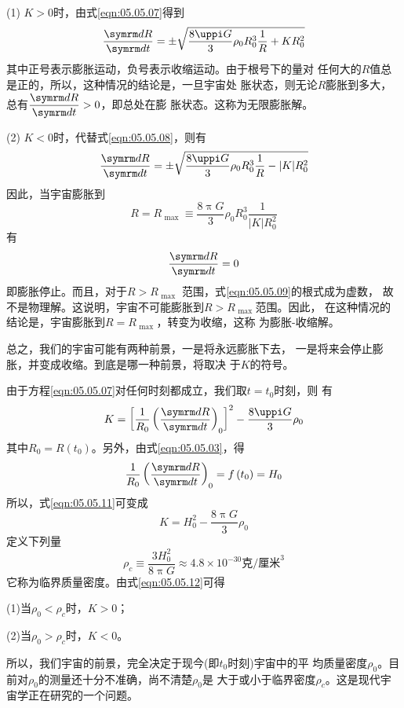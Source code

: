 (1) $ K > 0 $时，由式\eqref{eqn:05.05.07}得到
\begin{equation}\label{eqn:05.05.08}
  \frac { \dif R } { \dif t } = \pm \sqrt { \frac { 8 \uppi G } { 3 } \rho _ { 0 } R _ { 0 } ^ { 3 } \frac { 1 } { R } + K R _ 0 ^ { 2 } }
\end{equation}
其中正号表示膨胀运动，负号表示收缩运动。由于根号下的量对
任何大的$ R $值总是正的，所以，这种情况的结论是，一旦宇宙处
胀状态，则无论$ R $膨胀到多大，总有$ \dfrac { \dif R } { \dif t } > 0 $，即总处在膨
胀状态。这称为无限膨胀解。

(2) $ K < 0 $时，代替式\eqref{eqn:05.05.08}，则有
\begin{equation}\label{eqn:05.05.09}
  \frac { \dif R } { \dif t } = \pm \sqrt { \frac { 8 \uppi G } { 3 } \rho _ { 0 } R _ { 0 } ^ { 3 } \frac { 1 } { R } - | K | R _ 0 ^ { 2 } }
\end{equation}
因此，当宇宙膨胀到
\begin{equation}\label{eqn:05.05.10}
  R = R _ { \text { max } } \equiv \frac { 8 \uppi G } { 3 } \rho _ { 0 } R _ { 0 } ^ { 3 } \frac { 1 } { | K | R _ { 0 } ^ 2 }
\end{equation}
有
\begin{equation*}
  \frac { \dif R } { \dif t } = 0
\end{equation*}
即膨胀停止。而且，对于$ R > R _ { \text { max } } $ 范围，式\eqref{eqn:05.05.09}的根式成为虚数，
故不是物理解。这说明，宇宙不可能膨胀到$ R > R _ { \text { max } } $范围。因此，
在这种情况的结论是，宇宙膨胀到$ R = R _ { \text { max } } $，转变为收缩，这称
为膨胀-收缩解。

总之，我们的宇宙可能有两种前景，一是将永远膨胀下去，
一是将来会停止膨胀，并变成收缩。到底是哪一种前景，将取决
于$ K $的符号。

由于方程\eqref{eqn:05.05.07}对任何时刻都成立，我们取$ t=t_0 $时刻，则
有
\begin{equation}\label{eqn:05.05.11}
  K = \left[ \frac { 1 } { R _ { 0 } } \left( \frac { \dif R } { \dif t } \right) _ 0 \right] ^ { 2 } - \frac { 8 \uppi G } { 3 } \rho _ { 0 }
\end{equation}
其中$ R _ { 0 } = R \left( t _ { 0 } \right) $。另外，由式\eqref{eqn:05.05.03}，得
\begin{equation*}
  \frac { 1 } { R _ { 0 } } \left( \frac { \dif R } { \dif t } \right) _ { 0 } = f \left( t _ { 0 } \right) = H _ { 0 }
\end{equation*}
所以，式\eqref{eqn:05.05.11}可变成
\clearpage
\begin{equation}\label{eqn:05.05.12}
  K = H _ 0 ^ { 2 } - \frac { 8 \uppi G } { 3 } \rho _ { 0 }
\end{equation}
定义下列量
\begin{equation*}
  \rho _ { c } \equiv \frac { 3 H _ 0 ^ { 2 } } { 8 \uppi G } \approx 4.8 \times 10 ^ { -30 } \text{克/厘米} ^ 3
\end{equation*}
它称为临界质量密度。由式\eqref{eqn:05.05.12}可得

(1)当$ \rho _ { 0 } < \rho _ { c } $时，$ K > 0 $；

(2)当$ \rho _ { 0 } > \rho _ { c } $时，$ K < 0 $。

\noindent 所以，我们宇宙的前景，完全决定于现今(即$ t _ { 0 } $时刻)宇宙中的平
均质量密度$ \rho _ { 0 } $。目前对$ \rho _ { 0 } $的测量还十分不准确，尚不清楚$ \rho _ { 0 } $是
大于或小于临界密度$ \rho _ { c } $。这是现代宇宙学正在研究的一个问题。
